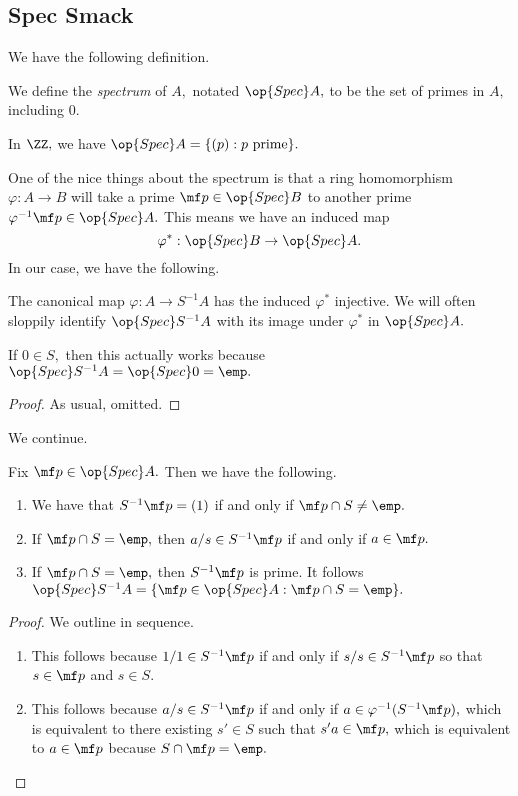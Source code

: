 \subsection{Spec Smack}
We have the following definition.
\begin{definition}[Spectrum]
    We define the \textit{spectrum} of $A,$ notated $\op{Spec}A,$ to be the set of primes in $A,$ including $0.$
\end{definition}
\begin{example}
    In $\ZZ,$ we have $\op{Spec}A=\{(p):p\text{ prime}\}.$
\end{example}
One of the nice things about the spectrum is that a ring homomorphism $\varphi:A\to B$ will take a prime $\mf p\in\op{Spec}B$ to another prime $\varphi^{-1}\mf p\in\op{Spec}A.$ This means we have an induced map
\[\varphi^*:\op{Spec}B\to\op{Spec}A.\]
In our case, we have the following.
\begin{proposition}
    The canonical map $\varphi:A\to S^{-1}A$ has the induced $\varphi^*$ injective. We will often sloppily identify $\op{Spec}S^{-1}A$ with its image under $\varphi^*$ in $\op{Spec}A.$
\end{proposition}
\begin{remark}
    If $0\in S,$ then this actually works because $\op{Spec}S^{-1}A=\op{Spec}0=\emp.$
\end{remark}
\begin{proof}
    As usual, omitted.
\end{proof}
We continue.
\begin{proposition}
    Fix $\mf p\in\op{Spec}A.$ Then we have the following.
    \begin{enumerate}[label=(\alph*)]
        \item We have that $S^{-1}\mf p=(1)$ if and only if $\mf p\cap S\ne\emp.$
        \item If $\mf p\cap S=\emp,$ then $a/s\in S^{-1}\mf p$ if and only if $a\in\mf p.$
        \item If $\mf p\cap S=\emp,$ then $S^{-1}\mf p$ is prime. It follows $\op{Spec}S^{-1}A=\{\mf p\in\op{Spec}A:\mf p\cap S=\emp\}.$
    \end{enumerate}
\end{proposition}
\begin{proof}
    We outline in sequence.
    \begin{enumerate}[label=(\alph*)]
        \item This follows because $1/1\in S^{-1}\mf p$ if and only if $s/s\in S^{-1}\mf p$ so that $s\in\mf p$ and $s\in S.$
        \item This follows because $a/s\in S^{-1}\mf p$ if and only if $a\in\varphi^{-1}(S^{-1}\mf p),$ which is equivalent to there existing $s'\in S$ such that $s'a\in\mf p,$ which is equivalent to $a\in\mf p$ because $S\cap\mf p=\emp.$
        \qedhere
    \end{enumerate}
\end{proof}
